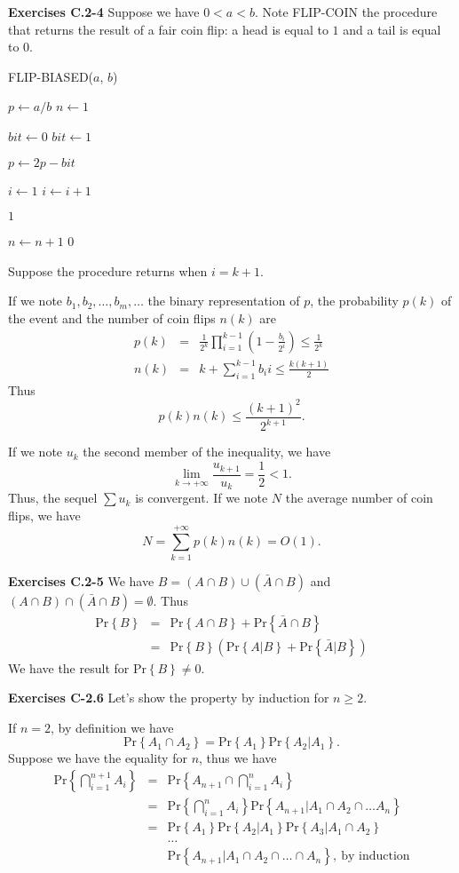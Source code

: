 \documentclass[a4paper,12pt]{article}
\newcommand{\newpar}[1]
{\bigskip \noindent \textbf{Exercises #1} \newline}
\newcommand{\la}{\leftarrow}
\newcommand{\prob}[1]{\mathrm{Pr}\left\{ #1 \right\}}
\begin{document}
\newpar{C.2-4}
Suppose we have $0 < a < b$.  Note \textmd{FLIP-COIN} the procedure
that returns the result of a fair coin flip: a head is equal to $1$
and a tail is equal to $0$.

\noindent
\textmd{FLIP-BIASED($a$, $b$)}
\begin{algorithmic}
  \STATE $p \la a/b$
  \STATE $n \la 1$
  
  \STATE $bit \la 0$
  \ELSE
  \STATE $bit \la 1$
  \ENDIF

  \STATE $p \la 2p - bit$
  
  \STATE $i\la 1$
  \STATE $i \la i+1$
  \ENDWHILE
  \ENDIF

  \RETURN $1$
  \ENDIF
  
  \STATE $n \la n+1$
  \ENDWHILE
  \RETURN $0$
\end{algorithmic}
Suppose the procedure returns when $i = k+1$.

If we note $b_1, b_2,\ldots,b_m,\dots$ the binary representation of
$p$, the probability $p(k)$ of the event and the number of coin flips
$n(k)$ are
\begin{eqnarray*}
  p(k) &=& \frac{1}{2^k}
  \prod_{i=1}^{k-1}\left(1-\frac{b_i}{2^i}\right) \le \frac{1}{2^k} \\
  n(k) &=& k + \sum_{i=1}^{k-1}b_ii \le \frac{k(k+1)}{2}
\end{eqnarray*}
Thus
\[ p(k) n(k) \le \frac{(k+1)^2}{2^{k+1}}.\]

If we note $u_k$ the second member of the inequality, we have
\[ \lim_{k \to +\infty}\frac{u_{k+1}}{u_k} = \frac{1}{2} < 1.\]
Thus, the sequel $\sum u_k$ is convergent.  If we note $N$ the average
number of coin flips, we have
\[ N = \sum_{k=1}^{+\infty}p(k)n(k) = O(1).\]

\newpar{C.2-5}
We have $B = (A \cap B) \cup (\bar{A} \cap B)$ and
$(A \cap B) \cap (\bar{A} \cap B) = \emptyset$.  Thus
\begin{eqnarray*}
  \prob{B} &=& \prob{A \cap B} + \prob{\bar{A} \cap B} \\
  &=& \prob{B}\left(\prob{A | B} + \prob{\bar{A} | B}\right)
\end{eqnarray*}
We have the result for $\prob{B} \not= 0$.

\newpar{C-2.6}
Let's show the property by induction for $n \ge 2$.

If $n=2$, by definition we have
\[ \prob{A_1 \cap A_2} = \prob{A_1} \prob{A_2 | A_1}.\]
Suppose we have the equality for $n$, thus we have
\begin{eqnarray*}
  \prob{\bigcap_{i=1}^{n+1}A_i} &=&
  \prob{A_{n+1} \cap \bigcap_{i=1}^nA_i} \\
  &=& \prob{\bigcap_{i=1}^nA_i} \prob{A_{n+1} | A_1 \cap A_2 \cap
    \ldots A_n} \\
  &=& \prob{A_1} \prob{A_2 | A_1} \prob{A_3 | A_1 \cap A_2} \\
  && \ldots \\ &&
  \prob{A_{n+1} | A_1 \cap A_2 \cap \ldots \cap A_n},\ 
  \mbox{by induction}
\end{eqnarray*}
\end{document}
